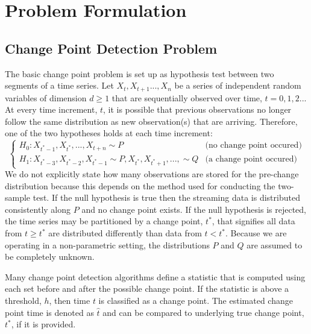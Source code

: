 \section{Problem Formulation}

\subsection{Change Point Detection Problem}
\label{probFormulation}
The basic change point problem is set up as hypothesis test between two segments of a time series. Let $X_t, X_{t+1}...,X_n$ be a series of independent random variables of dimension $d \geq 1$ that are sequentially observed over time, $t=0,1,2...$  At every time increment, $t$, it is possible that previous observations no longer follow the same distribution as new observation(s) that are arriving. Therefore, one of the two hypotheses holds at each time increment:
\begin{equation}
  \begin{cases}
    H_0: X_{t^*-1}, X_{t^*}, ...,X_{t+n} \sim  P & \text{(no change point occured)} \\
    H_1: X_{t^*-3},X_{t^*-2}, X_{t^*-1} \sim P, X_{t^*}, X_{t^*+1},...,  \sim Q & \text{(a change point occured)}
  \end{cases}
\end{equation}
We do not explicitly state how many observations are stored for the pre-change distribution because this depends on the method used for conducting the two-sample test. If the null hypothesis is true then the streaming data is distributed consistently along $P$ and no change point exists. If the null hypothesis is rejected, the time series may be partitioned by a change point, $t^*$, that signifies all data from $t \geq t^*$ are distributed differently than data from $t<t^*$. Because we are operating in a non-parametric setting, the distributions $P$ and $Q$ are assumed to be completely unknown. 



Many change point detection algorithms define a statistic that is computed using each set before and after the possible change point. If the statistic is above a threshold, $h$, then time $t$ is classified as a change point. The estimated change point time is denoted as $\hat{t}$ and can be compared to underlying true change point, $t^*$, if it is provided.

